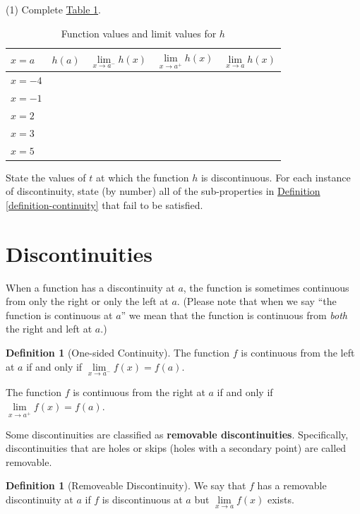 \documentclass[10pt,oneside,]{book}
\newcommand{\terminology}[1]{\textbf{#1}}
\theoremstyle{plain}
\theoremstyle{definition}
\newtheorem{definition}[theorem]{Definition}
\numberwithin{equation}{section}
\newcommand{\fe}[2]{#1\mathopen{}\left(#2\right)\mathclose{}}
\begin{document}
\begin{exercisegroup}(1)
\exercise[1.]\hypertarget{exercise-109}{\null}Complete \hyperref[table-discontinuities]{Table \ref{table-discontinuities}}.%
\begin{table}
\centering
\caption{Function values and limit values for \(h\)\label{table-discontinuities}}
\begin{tabular}{l|cccc}
\toprule
\(x=a\)&\(\fe{h}{a}\)&\(\lim\limits_{x\to a^{-}}\fe{h}{x}\)&\(\lim\limits_{x\to a^{+}}\fe{h}{x}\)&\(\lim\limits_{x\to a}\fe{h}{x}\)\\
\midrule
\(x=-4\)&&&&\\
\midrule
\(x=-1\)&&&&\\
\midrule
\(x=2\)&&&&\\
\midrule
\(x=3\)&&&&\\
\midrule
\(x=5\)&&&&\\
\bottomrule
\end{tabular}
\end{table}
\exercise[2.]\hypertarget{exercise-110}{\null}State the values of \(t\) at which the function \(h\) is discontinuous. For each instance of discontinuity, state (by number) all of the sub-properties in \hyperref[definition-continuity]{Definition \ref{definition-continuity}} that fail to be satisfied.%
\end{exercisegroup}
\par\smallskip\noindent
\typeout{************************************************}
\typeout{************************************************}
\section[Discontinuities]{Discontinuities}\label{section-discontinuities}
When a function has a discontinuity at \(a\), the function is sometimes continuous from only the right or only the left at \(a\). (Please note that when we say ``the function is continuous at \(a\)'' we mean that the function is continuous from \emph{both} the right and left at \(a\).)%
\begin{definition}[One-sided Continuity]\label{definition-4}
The function \(f\) is continuous from the left at \(a\) if and only if \(\lim\limits_{x\to a^{-}}\fe{f}{x}=\fe{f}{a}\).%
\par
The function \(f\) is continuous from the right at \(a\) if and only if \(\lim\limits_{x\to a^{+}}\fe{f}{x}=\fe{f}{a}\).%
\end{definition}
\par
Some discontinuities are classified as \terminology{removable discontinuities}. Specifically, discontinuities that are holes or skips (holes with a secondary point) are called removable.%
\begin{definition}[Removeable Discontinuity]\label{definition-5}
We say that \(f\) has a removable discontinuity at \(a\) if \(f\) is discontinuous at \(a\) but \(\lim\limits_{x\to a}\fe{f}{x}\) exists.%
\end{definition}
\typeout{************************************************}
\typeout{************************************************}
\end{document}
